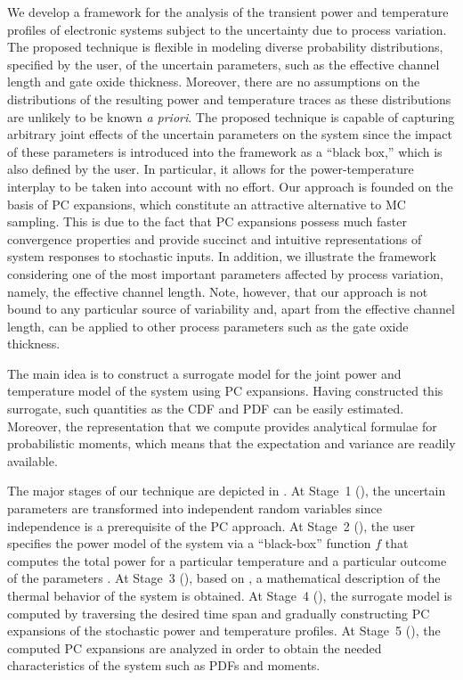 We develop a framework for the analysis of the transient power and temperature
profiles of electronic systems subject to the uncertainty due to process
variation. The proposed technique is flexible in modeling diverse probability
distributions, specified by the user, of the uncertain parameters, such as the
effective channel length and gate oxide thickness. Moreover, there are no
assumptions on the distributions of the resulting power and temperature traces
as these distributions are unlikely to be known \emph{a priori}. The proposed
technique is capable of capturing arbitrary joint effects of the uncertain
parameters on the system since the impact of these parameters is introduced into
the framework as a ``black box,'' which is also defined by the user. In
particular, it allows for the power-temperature interplay to be taken into
account with no effort. Our approach is founded on the basis of \acf{PC}
expansions, which constitute an attractive alternative to \ac{MC} sampling. This
is due to the fact that \ac{PC} expansions possess much faster convergence
properties and provide succinct and intuitive representations of system
responses to stochastic inputs. In addition, we illustrate the framework
considering one of the most important parameters affected by process variation,
namely, the effective channel length. Note, however, that our approach is not
bound to any particular source of variability and, apart from the effective
channel length, can be applied to other process parameters such as the gate
oxide thickness.

The main idea is to construct a surrogate model for the joint power and
temperature model of the system using \ac{PC} expansions. Having constructed
this surrogate, such quantities as the \acf{CDF} and \acf{PDF} can be easily
estimated. Moreover, the representation that we compute provides analytical
formulae for probabilistic moments, which means that the expectation and
variance are readily available.

The major stages of our technique are depicted in . At
Stage~1 (), the uncertain parameters \vu
are transformed into independent random variables \vz since independence is a
prerequisite of the \ac{PC} approach. At Stage~2 (), the
user specifies the power model of the system via a ``black-box'' function $f$
that computes the total power \vp for a particular temperature \vq and a
particular outcome of the parameters \vu. At Stage~3
(), based on , a
mathematical description of the thermal behavior of the system is obtained. At
Stage~4 (), the surrogate model is computed by
traversing the desired time span and gradually constructing \ac{PC} expansions
of the stochastic power and temperature profiles. At Stage~5
(), the computed \ac{PC} expansions are analyzed in
order to obtain the needed characteristics of the system such as \acp{PDF} and
moments.

